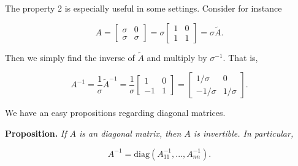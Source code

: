 \documentclass[a4paper,12pt,openany]{book}
\begin{document}
The property 2 is especially useful in some settings. Consider for instance

\[
A=
\begin{bmatrix}
\sigma & 0\\
\sigma & \sigma
\end{bmatrix}=\sigma\begin{bmatrix}
1 & 0\\
1 & 1
\end{bmatrix}=\sigma \tilde{A}.
\]

Then we simply find the inverse of \(\tilde{A}\) and multiply by \(\sigma^{-1}\). That is,

\[
A^{-1}=\frac{1}{\sigma}\tilde{A}^{-1}=\frac{1}{\sigma}
\begin{bmatrix}
1 & 0\\
-1 & 1
\end{bmatrix}=
\begin{bmatrix}
1/\sigma & 0\\
-1/\sigma & 1/\sigma
\end{bmatrix}.
\]

We have an easy propositions regarding diagonal matrices.

\textbf{Proposition.} \emph{If \(A\) is an diagonal matrix, then \(A\) is invertible. In particular,}

\[
A^{-1}=\text{diag}(A_{11}^{-1},...,A_{nn}^{-1}).
\]

\newpage
\nocite{*}
{}

\begin{spacing}{1}

\end{spacing}

\newpage
{}
{}
\begin{spacing}{1}
\printindex
\end{spacing}
\end{document}
